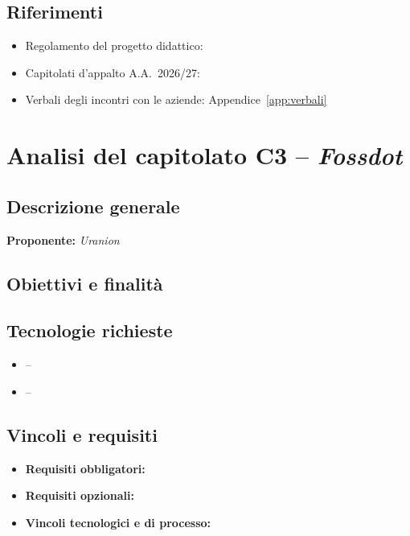 \documentclass[12pt,a4paper]{article}
\begin{document}
\subsection{Riferimenti}
\begin{itemize}
\tightlist
\item Regolamento del progetto didattico: 
\item Capitolati d'appalto A.A.~2026/27: 
\item Verbali degli incontri con le aziende: Appendice~\ref{app:verbali}
\end{itemize}

\section{Analisi del capitolato C3 -- \emph{Fossdot}}
\label{sec:c3}

\subsection{Descrizione generale}
\textbf{Proponente:} \emph{Uranion} \\

\subsection{Obiettivi e finalità}

\subsection{Tecnologie richieste}
\begin{itemize}
\tightlist
\item {} -- 
\item {} -- 
\end{itemize}

\subsection{Vincoli e requisiti}
\begin{itemize}
\tightlist
\item \textbf{Requisiti obbligatori:} 
\item \textbf{Requisiti opzionali:} 
\item \textbf{Vincoli tecnologici e di processo:} 
\end{itemize}
\end{document}
